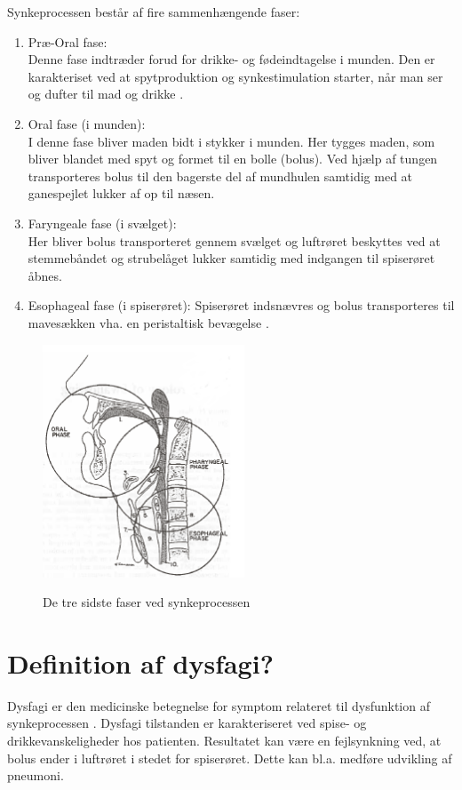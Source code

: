 Synkeprocessen består af fire sammenhængende faser:
\begin{enumerate}
\item Præ-Oral fase:\\
Denne fase indtræder forud for drikke- og fødeindtagelse  i munden. Den er karakteriset ved at spytproduktion og synkestimulation starter, når man ser og dufter til mad og drikke \cite [s. 12]{Kjaersgaard2013}.    
\item Oral fase (i munden): \\
I denne fase bliver maden bidt i stykker i munden. Her tygges maden, som bliver blandet med spyt og formet til en bolle (bolus). Ved hjælp af tungen transporteres bolus til den bagerste del af mundhulen samtidig med at ganespejlet lukker af op til næsen.
\item Faryngeale fase (i svælget): \\ Her bliver bolus transporteret gennem svælget og luftrøret beskyttes ved at stemmebåndet og strubelåget lukker samtidig med indgangen til spiserøret åbnes.     
\item Esophageal fase (i spiserøret):
Spiserøret indsnævres og bolus transporteres til mavesækken vha. en peristaltisk bevægelse \cite [s. 395]{Sand2008}.
\end{enumerate}

\begin{figure}[H]
\centering
{\includegraphics[width=6cm]
{Figure/dysfagi3faser}}
\caption{De tre sidste faser ved synkeprocessen\cite{Bass1992}}
\label{trefaser}
\end{figure}


\section{Definition af dysfagi?}
Dysfagi er den medicinske betegnelse for symptom relateret til dysfunktion af synkeprocessen \cite{KjaersgaardPh.d.studerende}. Dysfagi tilstanden er karakteriseret ved spise- og drikkevanskeligheder hos patienten. Resultatet kan være en fejlsynkning ved, at bolus ender i luftrøret i stedet for spiserøret. Dette kan bl.a. medføre udvikling af pneumoni.

